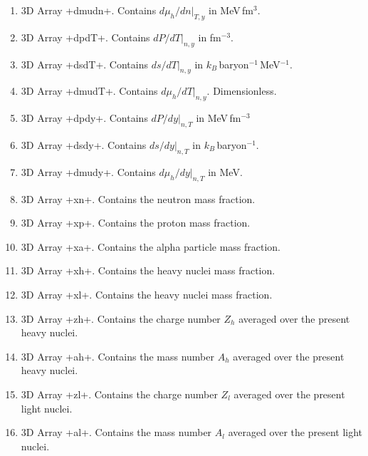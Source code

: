 \documentclass[letterpaper,11pt]{refart}
\begin{document}
\begin{enumerate}
 \item 3D Array \verbprm+dmudn+. Contains $d\mu_h/dn\vert_{T,y}$ in MeV\,fm$^3$. 

 \item 3D Array \verbprm+dpdT+. Contains $dP/dT\vert_{n,y}$ in fm$^{-3}$.

 \item 3D Array \verbprm+dsdT+. 
   Contains $ds/dT\vert_{n,y}$ in $k_B$\,baryon$^{-1}$\,MeV$^{-1}$. 

 \item 3D Array \verbprm+dmudT+. Contains $d\mu_h/dT\vert_{n,y}$. Dimensionless. 

 \item 3D Array \verbprm+dpdy+. Contains $dP/dy\vert_{n,T}$ in MeV\,fm$^{-3}$ 

 \item 3D Array \verbprm+dsdy+. Contains $ds/dy\vert_{n,T}$ in  $k_B$\,baryon$^{-1}$. 

 \item 3D Array \verbprm+dmudy+. Contains $d\mu_h/dy\vert_{n,T}$ in MeV. 

 \item 3D Array \verbprm+xn+. Contains the neutron mass fraction. 

 \item 3D Array \verbprm+xp+. Contains the proton mass fraction.

 \item 3D Array \verbprm+xa+. Contains the alpha particle mass fraction.

 \item 3D Array \verbprm+xh+. Contains the heavy nuclei mass fraction.

 \item 3D Array \verbprm+xl+. Contains the heavy nuclei mass fraction.

 \item 3D Array \verbprm+zh+. Contains the charge number $Z_h$ 
   averaged over the present heavy nuclei.

 \item 3D Array \verbprm+ah+. Contains the mass number $A_h$ 
   averaged over the present heavy nuclei.

 \item 3D Array \verbprm+zl+. Contains the charge number $Z_l$ 
   averaged over the present light nuclei.

 \item 3D Array \verbprm+al+. Contains the mass number $A_l$ 
   averaged over the present light nuclei.

\end{enumerate}
\end{document}
